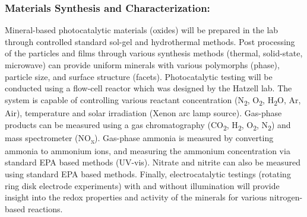 \subsubsection*{Materials Synthesis and Characterization:}
\vspace{1mm}
Mineral-based photocatalytic materials (oxides) will be prepared in the lab through controlled standard sol-gel and hydrothermal methods\cite{zhu2012hydrothermal}. Post processing of the particles and films through various synthesis methods (thermal, solid-state, microwave) can provide uniform minerals with various polymorphs (phase), particle size, and surface structure (facets)\cite{yu2003effect, macwan2011review,music1997chemical}. Photocatalytic testing will be conducted using a flow-cell reactor which was designed by the Hatzell lab. The system is capable of controlling various reactant concentration (N\textsubscript{2}, O\textsubscript{2}, H\textsubscript{2}O, Ar, Air), temperature and solar irradiation (Xenon arc lamp source). Gas-phase products can be measured using a gas chromatography (CO\textsubscript{2}, H\textsubscript{2}, O\textsubscript{2}, N\textsubscript{2}) and mass spectrometer (NO\textsubscript{x}). Gas-phase ammonia is measured by converting ammonia to ammonium ions, and measuring the ammonium concentration via standard EPA based methods (UV-vis)\cite{o1993epa}. Nitrate and nitrite can also be measured using standard EPA based methods\cite{doane2003spectrophotometric}. Finally, electrocatalytic testings (rotating ring disk electrode experiments) with and without illumination will provide insight into the redox properties and activity of the minerals for various nitrogen-based reactions. 

